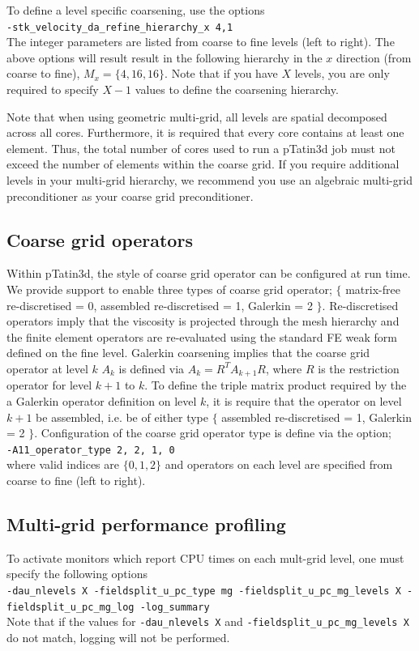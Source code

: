 \documentclass[paper=a4, fontsize=11pt,twoside]{scrartcl}
\newcommand{\ptat}{{pTatin3d}}
\newcommand{\shellcmd}[1]{\\\indent\indent\texttt{\hspace{5mm}\footnotesize #1}\\}
\newcommand{\unix}[1]{\texttt{\footnotesize #1}}
\begin{document}
{{To define a level specific coarsening, use the options
\shellcmd{-stk\_velocity\_da\_refine\_hierarchy\_x 4,1}
The integer parameters are listed from coarse to fine levels (left to right). The above options will result result in the following hierarchy in the $x$ direction (from coarse to fine), $M_x = \{ 4, 16, 16 \}$.
Note that if you have $X$ levels, you are only required to specify $X-1$ values to define the coarsening hierarchy. 


Note that when using geometric multi-grid, all levels are spatial decomposed across all cores. Furthermore, it is required that every core contains at least one element. Thus, the total number of cores used to run a {\ptat} job must not exceed the number of elements within the coarse grid. If you require additional levels in your multi-grid hierarchy, we recommend you use an algebraic multi-grid preconditioner as your coarse grid preconditioner.

\subsection{Coarse grid operators}
Within {\ptat}, the style of coarse grid operator can be configured at run time. We provide support to enable three types of coarse grid operator; $\{$ matrix-free re-discretised = 0, assembled re-discretised = 1, Galerkin = 2 $\}$. Re-discretised operators imply that the viscosity is projected through the mesh hierarchy and the finite element operators are re-evaluated using the standard FE weak form defined on the fine level. Galerkin coarsening implies that the coarse grid operator at level $k$ $A_k$ is defined via $A_k = R^T A_{k+1} R$, where $R$ is the restriction operator for level $k+1$ to $k$. To define the triple matrix product required by the a Galerkin operator definition on level $k$, it is require that the operator on level $k+1$ be assembled, i.e. be of either type $\{$ assembled re-discretised = 1, Galerkin = 2 $\}$. Configuration of the coarse grid operator type is define via the option;
\shellcmd{-A11\_operator\_type 2, 2, 1, 0}
where valid indices are $\{ 0, 1, 2 \}$ and operators on each level are specified from coarse to fine (left to right).



\subsection{Multi-grid performance profiling}
To activate monitors which report CPU times on each mult-grid level, one must specify the following options
\shellcmd{-dau\_nlevels X -fieldsplit\_u\_pc\_type mg -fieldsplit\_u\_pc\_mg\_levels X -fieldsplit\_u\_pc\_mg\_log -log\_summary}
Note that if the values for \unix{-dau\_nlevels X} and \unix{-fieldsplit\_u\_pc\_mg\_levels X} do not match, logging will not be performed.



}}
\end{document}
